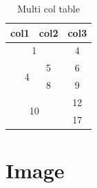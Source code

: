 \documentclass{article}
\begin{document}
\begin{table}[]
    \centering
    \begin{tabular}{|r|c|c|}
        \hline
        col1 & col2 & col3\\
        \hline
        \multicolumn{2}{|c|}{1} & 4\\
        \hline
        \multirow{2}{*}{4}  & 5 & 6\\
        \cline{2-3}
        
         & 8  & 9\\
        \hline
        \multicolumn{2}{|c|}{\multirow{2}{*}{10}} & 12\\
        \cline{3-3}
        \multicolumn{2}{|c|}{} & 17 \\
        \hline
        
    \end{tabular}
    \caption{Multi col table}
    \label{tab:Multi col table}
\end{table}

\section{Image}
\end{document}
